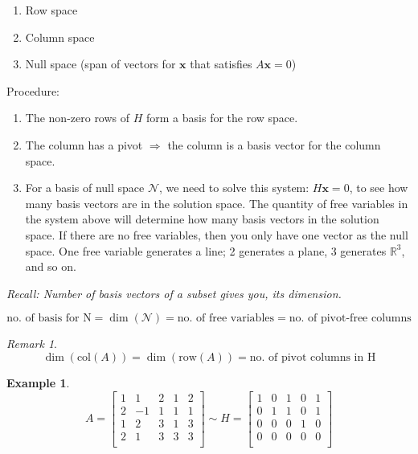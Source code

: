 \documentclass[12pt]{article}
\theoremstyle{plain}
\theoremstyle{remark}
\newtheorem{remark}{Remark}
\theoremstyle{definition}
\newtheorem{example}{Example}[section]
\begin{document}
\begin{enumerate}
\def\labelenumi{\alph{enumi})}
\item
  Row space
\item
  Column space
\item
  Null space (span of vectors for \(\mathbf{x}\) that satisfies
  \(A\mathbf{x} = 0\))
\end{enumerate}

Procedure:

\begin{enumerate}
\def\labelenumi{\alph{enumi})}
\item
  The non-zero rows of \(H\) form a basis for the row space.
\item
  The column has a pivot \(\Rightarrow\) the column is a basis vector
  for the column space.
\item
  For a basis of null space \(\mathcal{N}\), we need to solve this
  system: \(H\mathbf{x} = 0\), to see how many basis vectors are in
  the solution space. The quantity of free variables in the system above
  will determine how many basis vectors in the solution space. If there
  are no free variables, then you only have one vector as the null
  space. One free variable generates a line; 2 generates a plane, 3
  generates \(\mathbb{R}^{3}\), and so on.
\end{enumerate}

\emph{Recall: Number of basis vectors of a subset gives you, its
dimension.}

\[\text{no.\ of\ basis\ for\ N} = \dim\left( \mathcal{N} \right) = \text{no.\ of\ free\ variables} = \text{no.\ of\ pivot-free\ columns}\]

\begin{remark}
\[\dim\left( \text{col}(A) \right) = \dim\left( \text{row}(A) \right) = \text{no.\ of\ pivot\ columns\ in\ H}\]
\end{remark}

\begin{example}
\[A = \begin{bmatrix}
1 & 1 & 2 & 1 & 2 \\
2 & - 1 & 1 & 1 & 1 \\
1 & 2 & 3 & 1 & 3 \\
2 & 1 & 3 & 3 & 3 \\
\end{bmatrix}\sim H = \begin{bmatrix}
1 & 0 & 1 & 0 & 1 \\
0 & 1 & 1 & 0 & 1 \\
0 & 0 & 0 & 1 & 0 \\
0 & 0 & 0 & 0 & 0 \\
\end{bmatrix}\]
\end{example}
\end{document}
